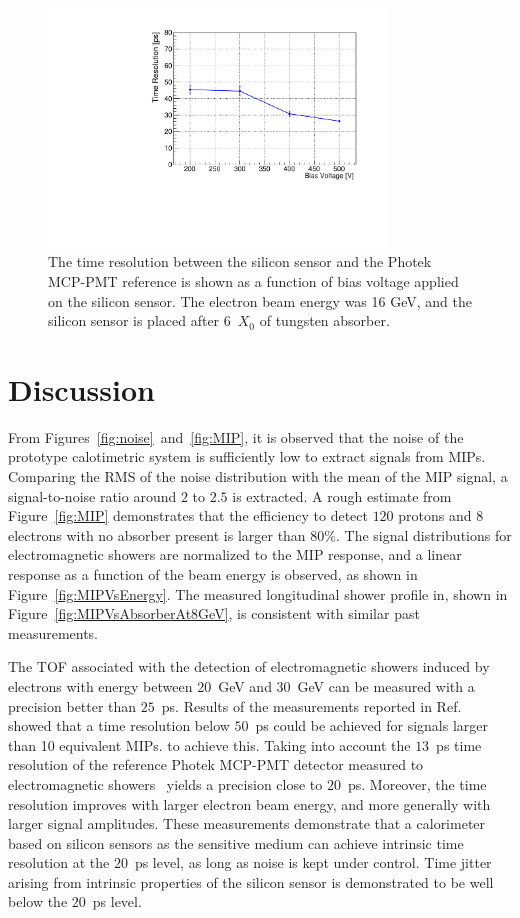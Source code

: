 \begin{figure}[h] 
\centering
\includegraphics[width=0.8\textwidth]{plots/SigmaT_vs_DV_lin30Stamp.pdf} 
\caption{The time resolution between the silicon sensor and the Photek MCP-PMT 
reference is shown as a function of bias voltage applied on the silicon sensor. The electron beam
energy was 16 GeV, and the silicon sensor is placed
after 6~$X_0$ of tungsten absorber.} 
\label{fig:SigmaT_vs_DV_lin30Stamp} 
\end{figure} 

\section{Discussion} \label{sec:discussion} 
From Figures~\ref{fig:noise}~and~\ref{fig:MIP}, it is observed that the noise of the
prototype calotimetric system is sufficiently low to extract signals from MIPs. Comparing the
RMS of the noise distribution with the mean of the MIP signal, a
signal-to-noise ratio around $2$ to $2.5$ is extracted. A rough estimate from
Figure~\ref{fig:MIP} demonstrates that the efficiency to detect $120$\GeV
protons and $8$\GeV electrons with no absorber present is larger than $80\%$.
The signal distributions for electromagnetic showers are normalized to
the MIP response, and a linear response as a function of the beam
energy is observed, as shown in Figure~\ref{fig:MIPVsEnergy}. The
measured longitudinal shower profile in, shown in
Figure~\ref{fig:MIPVsAbsorberAt8GeV}, is consistent with similar past measurements.

The TOF associated with the detection of electromagnetic showers
induced by electrons with energy between $20$~GeV and $30$~GeV can be measured
with a precision better than $25$~ps. Results of the  measurements reported
in Ref.~\cite{akchurin} showed that a time resolution below $50$~ps could be
achieved for signals larger than 10 equivalent MIPs. to achieve
this. Taking into account the $13$~ps time resolution of the reference Photek MCP-PMT
detector measured to electromagnetic showers~\cite{Ronzhin2015288} yields a precision close to
$20$~ps. Moreover, the time resolution improves with larger electron
beam energy, and more generally with larger signal
amplitudes. These measurements demonstrate that a calorimeter based on silicon
sensors as the sensitive medium can achieve intrinsic time resolution at the
$20$~ps level, as long as noise is kept under control. Time jitter arising from
intrinsic properties of the silicon sensor is demonstrated to be well below the
$20$~ps level.

